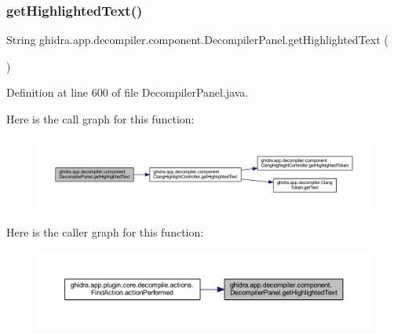 \subsubsection{\texorpdfstring{getHighlightedText()}{getHighlightedText()}}
{\footnotesize\ttfamily String ghidra.\+app.\+decompiler.\+component.\+Decompiler\+Panel.\+get\+Highlighted\+Text (\begin{DoxyParamCaption}{ }\end{DoxyParamCaption})\hspace{0.3cm}{\ttfamily [inline]}}



Definition at line 600 of file Decompiler\+Panel.\+java.

Here is the call graph for this function\+:
\nopagebreak
\begin{figure}[H]
\begin{center}
\leavevmode
\includegraphics[width=350pt]{classghidra_1_1app_1_1decompiler_1_1component_1_1_decompiler_panel_aac878cbe7f1841efe8649b7ec1a731cd_cgraph}
\end{center}
\end{figure}
Here is the caller graph for this function\+:
\nopagebreak
\begin{figure}[H]
\begin{center}
\leavevmode
\includegraphics[width=350pt]{classghidra_1_1app_1_1decompiler_1_1component_1_1_decompiler_panel_aac878cbe7f1841efe8649b7ec1a731cd_icgraph}
\end{center}
\end{figure}
\mbox{\label{classghidra_1_1app_1_1decompiler_1_1component_1_1_decompiler_panel_a82fded4495c1e52154d64e6820b01c29}} 
